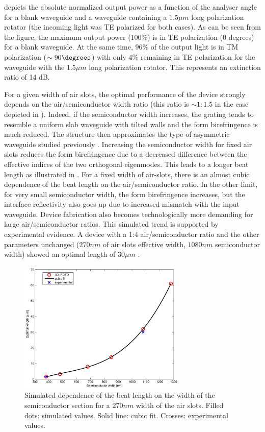  depicts the absolute normalized output
power as a function of the analyser angle for a blank waveguide and a waveguide containing a $1.5 \mu m$ long
polarization rotator (the incoming light was TE polarized for both
cases). As can be seen from the figure, the maximum output power
($100\%$) is in TE polarization (0 degrees) for a blank waveguide. At the
same time, $96\%$ of the output light is in TM polarization ($\sim
90\degrees$) with only $4\%$ remaining in TE polarization for the
waveguide with the $1.5 \mu m$ long polarization rotator. This
represents an extinction ratio of 14 dB.

For a given width of air slots, the optimal performance of the device
strongly depends on the air/semiconductor width ratio (this ratio is 
$\sim 1:1.5$ in the case depicted in ). Indeed, if the semiconductor
width increases, the grating tends to resemble a uniform slab
waveguide with tilted walls and the form birefringence is much
reduced. The structure then approximates the type of asymmetric
waveguide studied previously \cite{taillaert_compact}. Increasing the semiconductor width
for fixed air slots reduces the form birefringence due to a decreased
difference between the effective indices of the two orthogonal
eigenmodes. This leads to a longer beat length as illustrated in
. For a fixed width of air-slots, there is an almost cubic
dependence of the beat length on the air/semiconductor ratio. In the
other limit, for very small semiconductor width, the form
birefringence increases, but the interface reflectivity also goes up
due to increased mismatch with the input waveguide. Device fabrication
also becomes technologically more demanding for large
air/semiconductor ratios. This simulated trend is supported by
experimental evidence. A device with a 1:4 air/semiconductor ratio and
the other parameters unchanged ($270 nm$ of air slots effective width,
$1080 nm$ semiconductor width) showed an optimal length of $30 \mu m$
.

\begin{figure}[htbp]
  \begin{center}
    \includegraphics[width=8cm]{pics/polrot_optimalL_P}
  \end{center}
  \caption{Simulated dependence of the beat length on the width of the
  semiconductor section for a $270 nm$ width of the air slots. Filled
  dots: simulated values. Solid line: cubic fit. Crosses: experimental
  values.}
  \label{fig:polrot_optimalL_P}
\end{figure}

